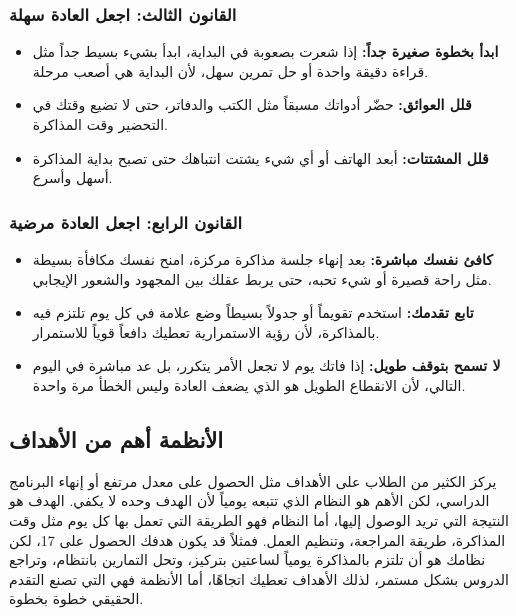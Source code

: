 \documentclass[12pt,a4paper]{book}
\begin{document}
\subsubsection{القانون الثالث: اجعل العادة سهلة}

\begin{itemize}
	\item \textbf{ابدأ بخطوة صغيرة جداً:} إذا شعرت بصعوبة في البداية، ابدأ بشيء بسيط جداً مثل قراءة دقيقة واحدة أو حل تمرين سهل، لأن البداية هي أصعب مرحلة.
	
	\item \textbf{قلل العوائق:} حضّر أدواتك مسبقاً مثل الكتب والدفاتر، حتى لا تضيع وقتك في التحضير وقت المذاكرة.
	
	\item \textbf{قلل المشتتات:} أبعد الهاتف أو أي شيء يشتت انتباهك حتى تصبح بداية المذاكرة أسهل وأسرع.
\end{itemize}

\subsubsection{القانون الرابع: اجعل العادة مرضية}

\begin{itemize}
	\item \textbf{كافئ نفسك مباشرة:} بعد إنهاء جلسة مذاكرة مركزة، امنح نفسك مكافأة بسيطة مثل راحة قصيرة أو شيء تحبه، حتى يربط عقلك بين المجهود والشعور الإيجابي.
	
	\item \textbf{تابع تقدمك:} استخدم تقويماً أو جدولاً بسيطاً وضع علامة في كل يوم تلتزم فيه بالمذاكرة، لأن رؤية الاستمرارية تعطيك دافعاً قوياً للاستمرار.
	
	\item \textbf{لا تسمح بتوقف طويل:} إذا فاتك يوم لا تجعل الأمر يتكرر، بل عد مباشرة في اليوم التالي، لأن الانقطاع الطويل هو الذي يضعف العادة وليس الخطأ مرة واحدة.
\end{itemize}
	\subsection{الأنظمة أهم من الأهداف}
	\label{sec:systems-over-goals}
	
	يركز الكثير من الطلاب على الأهداف مثل الحصول على معدل مرتفع أو إنهاء البرنامج الدراسي، لكن الأهم هو النظام الذي تتبعه يومياً لأن الهدف وحده لا يكفي. الهدف هو النتيجة التي تريد الوصول إليها، أما النظام فهو الطريقة التي تعمل بها كل يوم مثل وقت المذاكرة، طريقة المراجعة، وتنظيم العمل. فمثلاً قد يكون هدفك الحصول على 17، لكن نظامك هو أن تلتزم بالمذاكرة يومياً لساعتين بتركيز، وتحل التمارين بانتظام، وتراجع الدروس بشكل مستمر، لذلك الأهداف تعطيك اتجاهًا، أما الأنظمة فهي التي تصنع التقدم الحقيقي خطوة بخطوة.
	
\end{document}
